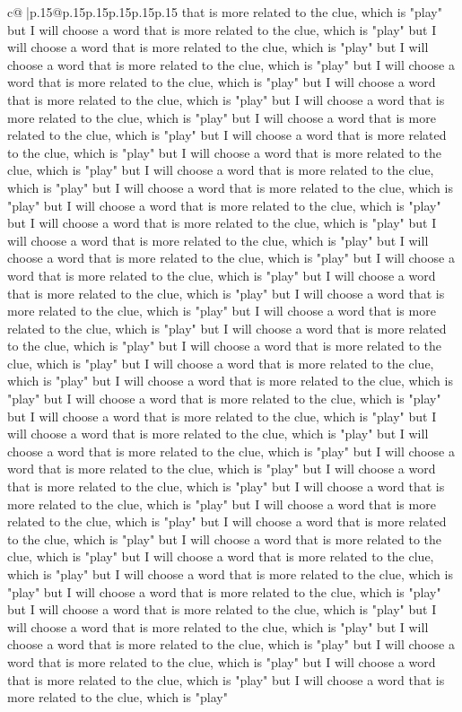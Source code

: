 \documentclass{article}
\begin{document}
{\begin{supertabular}{c@{$\;$}|p{.15\linewidth}@{}p{.15\linewidth}p{.15\linewidth}p{.15\linewidth}p{.15\linewidth}p{.15\linewidth}}
{{{that is more related to the clue, which is "play" but I will choose a word that is more related to the clue, which is "play" but I will choose a word that is more related to the clue, which is "play" but I will choose a word that is more related to the clue, which is "play" but I will choose a word that is more related to the clue, which is "play" but I will choose a word that is more related to the clue, which is "play" but I will choose a word that is more related to the clue, which is "play" but I will choose a word that is more related to the clue, which is "play" but I will choose a word that is more related to the clue, which is "play" but I will choose a word that is more related to the clue, which is "play" but I will choose a word that is more related to the clue, which is "play" but I will choose a word that is more related to the clue, which is "play" but I will choose a word that is more related to the clue, which is "play" but I will choose a word that is more related to the clue, which is "play" but I will choose a word that is more related to the clue, which is "play" but I will choose a word that is more related to the clue, which is "play" but I will choose a word that is more related to the clue, which is "play" but I will choose a word that is more related to the clue, which is "play" but I will choose a word that is more related to the clue, which is "play" but I will choose a word that is more related to the clue, which is "play" but I will choose a word that is more related to the clue, which is "play" but I will choose a word that is more related to the clue, which is "play" but I will choose a word that is more related to the clue, which is "play" but I will choose a word that is more related to the clue, which is "play" but I will choose a word that is more related to the clue, which is "play" but I will choose a word that is more related to the clue, which is "play" but I will choose a word that is more related to the clue, which is "play" but I will choose a word that is more related to the clue, which is "play" but I will choose a word that is more related to the clue, which is "play" but I will choose a word that is more related to the clue, which is "play" but I will choose a word that is more related to the clue, which is "play" but I will choose a word that is more related to the clue, which is "play" but I will choose a word that is more related to the clue, which is "play" but I will choose a word that is more related to the clue, which is "play" but I will choose a word that is more related to the clue, which is "play" but I will choose a word that is more related to the clue, which is "play" but I will choose a word that is more related to the clue, which is "play" but I will choose a word that is more related to the clue, which is "play" but I will choose a word that is more related to the clue, which is "play" but I will choose a word that is more related to the clue, which is "play" but I will choose a word that is more related to the clue, which is "play" but I will choose a word that is more related to the clue, which is "play" but I will choose a word that is more related to the clue, which is "play" }}}
\end{supertabular}}
\end{document}
